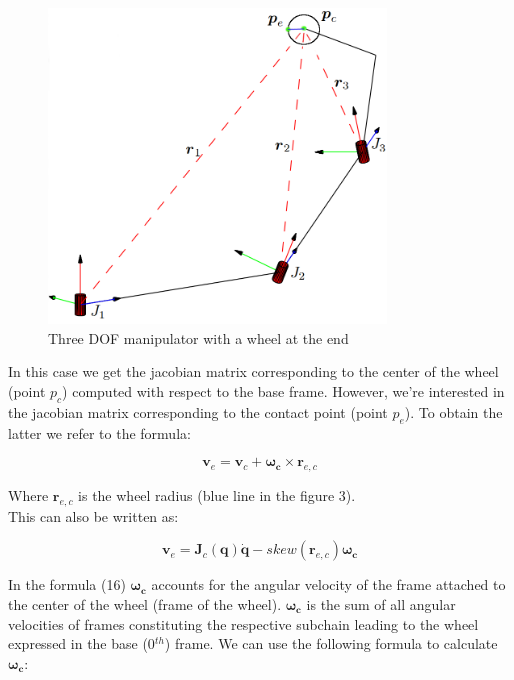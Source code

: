 \documentclass[a4paper]{article}
\begin{document}
\begin{figure}[h!]
  \centering
    \includegraphics[width=0.8\textwidth]{jacobian1}
  \caption{Three DOF manipulator with a wheel at the end}
\end{figure}

\noindent In this case we get the jacobian matrix corresponding to the center of the wheel (point $p_{c}$) computed with respect to the base frame. However, we're interested  in the jacobian matrix corresponding to the contact point (point $p_{e}$). To obtain the latter we refer to the formula:

\begin{equation}
\boldsymbol{v}_{e} = \boldsymbol{v}_{c} + \boldsymbol{\omega_{c}} \times \boldsymbol{r}_{e, c} 
\end{equation}

\noindent Where $\boldsymbol{r}_{e, c}$ is the wheel radius (blue line in the figure 3).\\

\noindent This can also be written as:

\begin{equation}
\boldsymbol{v}_{e} = \boldsymbol{J}_{c}(\boldsymbol{q})\boldsymbol{\dot{q}} - skew(\boldsymbol{r}_{e, c})\boldsymbol{\omega_{c}}
\end{equation}

\noindent In the formula (16) $\boldsymbol{\omega_{c}}$ accounts for the angular velocity of the frame attached to the center of the wheel (frame of the wheel). $\boldsymbol{\omega_{c}}$ is the sum of all angular velocities
of frames constituting the respective subchain leading to the wheel expressed in the base (0$^{th}$) frame. We can use the following formula to calculate $\boldsymbol{\omega_{c}}$:
\end{document}
